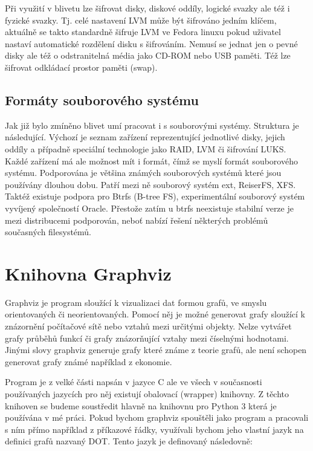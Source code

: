 \documentclass[color,table,oneside,nolot,nolof]{fithesis}
\begin{document}
	Při využití v blivetu lze šifrovat disky, diskové oddíly, logické svazky ale též i fyzické svazky. Tj. celé nastavení LVM může být šifrováno jedním klíčem, aktuálně se takto 
	standardně šifruje LVM ve Fedora linuxu pokud uživatel nastaví automatické rozdělení disku s šifrováním. Nemusí se jednat jen o pevné disky ale též o odstranitelná média jako
	CD-ROM nebo USB paměti. Též lze šifrovat odkládací prostor paměti (swap).

\subsection{Formáty souborového systému}
  Jak již bylo zmíněno blivet umí pracovat i s souborovými systémy. Struktura je následující. Výchozí je seznam zařízení reprezentující jednotlivé disky, jejich oddíly a případně
	speciální technologie jako RAID, LVM či šifrování LUKS. Každé zařízení má ale možnost mít i formát, čímž se myslí formát souborového systému. Podporována je většina známých 
	souborových
	systémů které jsou používány dlouhou dobu. Patří mezi ně souborový systém ext, ReiserFS, XFS. Taktéž existuje podpora pro Btrfs (B-tree FS), experimentální souborový systém 
	vyvíjený společností Oracle. Přestože zatím u btrfs neexistuje stabilní verze je mezi distribucemi podporován, neboť nabízí řešení některých problémů současných filesystémů.

\section{Knihovna Graphviz}
	Graphviz je program sloužící k vizualizaci dat formou grafů, ve smyslu orientovaných či neorientovaných. Pomocí něj je možné generovat grafy sloužící k znázornění počítačové sítě nebo
	vztahů mezi určitými objekty. Nelze vytvářet grafy průběhů funkcí či grafy znázorňující vztahy mezi číselnými hodnotami. Jinými slovy graphviz generuje grafy které známe z teorie grafů,
	ale není schopen generovat grafy známé například z ekonomie.

	Program je z velké části napsán v jazyce C ale ve všech v současnosti používaných jazycích pro něj existují obalovací (wrapper) knihovny. Z těchto knihoven se budeme soustředit hlavně na
	knihovnu pro Python 3 která je používána v mé práci. Pokud bychom graphviz spouštěli jako program a pracovali s ním přímo například z příkazové řádky, využívali bychom jeho vlastní jazyk
	na definici grafů nazvaný DOT. Tento jazyk je definovaný následovně:
\end{document}
